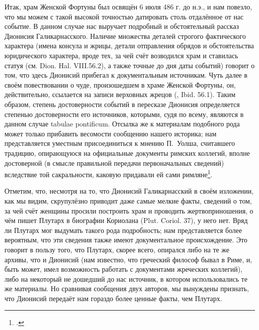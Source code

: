 


Итак, храм Женской Фортуны был освящён 6 июля 486 г. до н.э., и нам повезло, что мы можем с такой высокой точностью датировать столь отдалённое от нас событие. В данном случае нас выручает подробный и обстоятельный рассказ Дионисия Галикарнасского. Наличие множества деталей строгого фактического характера (имена консула и жрицы, детали отправления обрядов и обстоятельства юридического характера, вроде тех, за чей счёт возводился храм и ставилась статуя (см. Dion. Hal. VIII.56.2), а также точные до дня даты событий) говорит о том, что здесь Дионисий прибегал к документальным источникам. Чуть далее в своём повествовании о чуде, произошедшем в храме Женской Фортуны, он, действительно, ссылается на записи верховных жрецов (, Ibid. 56.1). Таким образом, степень достоверности событий в пересказе Дионисия определяется степенью достоверности его источников, которыми, судя по всему, являются в данном случае tabulae pontificum. Отсылка же к материалам подобного рода может только прибавить весомости сообщению нашего историка; нам представляется уместным присоединиться к мнению П.~Уолша, считавшего традицию, опирающуюся на официальные документы римских коллегий, вполне достоверной (в смысле правильной передачи первоначальных сведений) вследствие той сакральности, каковую придавали ей сами римляне\footcite[P. 34]{Walsh1974}.


Отметим, что, несмотря на то, что Дионисий Галикарнасский в своём изложении, как мы видим, скрупулёзно приводит даже самые мелкие факты, сведений о том, за чей счёт женщины просили построить храм и проводить жертвоприношения, о чём пишет Плутарх в биографии Кориолана (Plut. Coriol. 37), у него нет. Вряд ли Плутарх мог выдумать такого рода подробность; нам представляется более вероятным, что эти сведения также имеют документальное происхождение. Это говорит в пользу того, что Плутарх, скорее всего, опирался либо на те же архивы, что и Дионисий (нам известно, что греческий философ бывал в Риме, и, быть может, имел возможность работать с документами жреческих коллегий), либо на некоторый не дошедший до нас источник, в котором использовались те же материалы. Но сравнивая сообщения двух авторов, мы вынуждены признать, что Дионисий передаёт нам гораздо более ценные факты, чем Плутарх.

